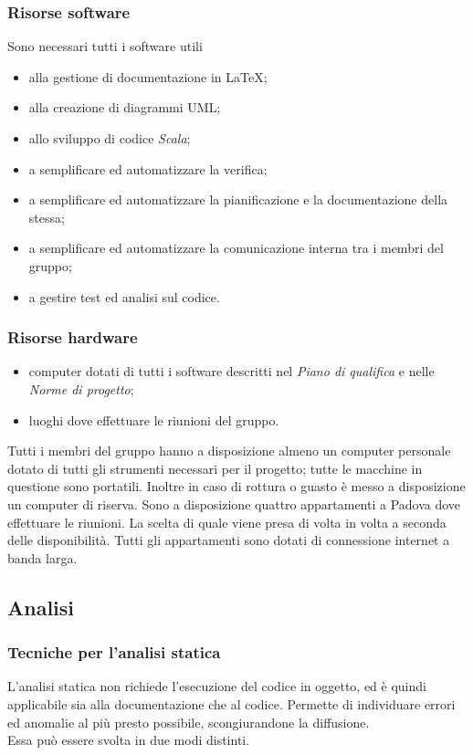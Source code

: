 \documentclass[a4paper]{article}
\begin{document}
			\subsubsection{Risorse software}
				Sono necessari tutti i software utili
				\begin{itemize}
					\item alla gestione di documentazione in \LaTeX;
					\item alla creazione di diagrammi UML;
					\item allo sviluppo di codice \emph{Scala};
					\item a semplificare ed automatizzare la verifica;
					\item a semplificare ed automatizzare la pianificazione e la documentazione della stessa;
					\item a semplificare ed automatizzare la comunicazione interna tra i membri del gruppo;
					\item a gestire test ed analisi sul codice.
				\end{itemize}
				\subsubsection{Risorse hardware}
					\begin{itemize}
						\item computer dotati di tutti i software descritti nel \emph{Piano di qualifica} e nelle
						\emph{Norme di progetto};
						\item luoghi dove effettuare le riunioni del gruppo.
					\end{itemize}
				Tutti i membri del gruppo hanno a disposizione almeno un computer personale dotato di tutti gli strumenti
				necessari per il progetto; tutte le macchine in questione sono portatili. Inoltre in caso di rottura o guasto
				è messo a disposizione un computer di riserva. Sono a disposizione quattro appartamenti a Padova dove
				effettuare le riunioni. La scelta di quale viene presa di volta in volta a seconda delle disponibilità. Tutti
				gli appartamenti sono dotati di connessione internet a banda larga.				
				

		\subsection{Analisi}
			\subsubsection{Tecniche per l'analisi statica}
				L'analisi statica non richiede l'esecuzione del codice in oggetto, ed è quindi applicabile sia 
				alla documentazione che al codice. Permette di individuare errori ed anomalie al più presto possibile, 
				scongiurandone la diffusione. \\ Essa può essere svolta in due modi distinti.
\end{document}
